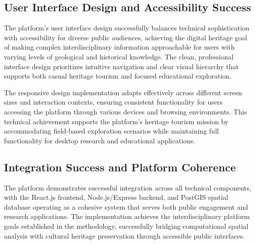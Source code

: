\subsection{User Interface Design and Accessibility Success}
\label{subsec:user_interface_success}

The platform's user interface design successfully balances technical sophistication with accessibility for diverse public audiences, achieving the digital heritage goal of making complex interdisciplinary information approachable for users with varying levels of geological and historical knowledge. The clean, professional interface design prioritizes intuitive navigation and clear visual hierarchy that supports both casual heritage tourism and focused educational exploration.


The responsive design implementation adapts effectively across different screen sizes and interaction contexts, ensuring consistent functionality for users accessing the platform through various devices and browsing environments. This technical achievement supports the platform's heritage tourism mission by accommodating field-based exploration scenarios while maintaining full functionality for desktop research and educational applications.

\subsection{Integration Success and Platform Coherence}
\label{subsec:integration_success}

The platform demonstrates successful integration across all technical components, with the React.js frontend, Node.js/Express backend, and PostGIS spatial database operating as a cohesive system that serves both public engagement and research applications. The implementation achieves the interdisciplinary platform goals established in the methodology, successfully bridging computational spatial analysis with cultural heritage preservation through accessible public interfaces.

